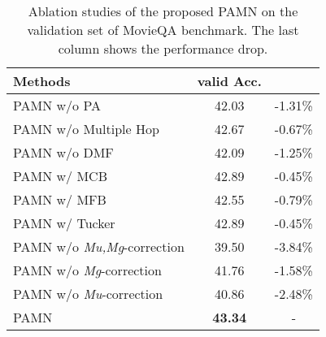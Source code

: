 \documentclass[10pt,twocolumn,letterpaper]{article}
\begin{document}
\begin{table}[t]
	\begin{center}
		\begin{tabular}{l||c|c}
			\hline 
			Methods                                   & valid Acc.     &   \\ \hline \hline
			PAMN w/o PA                               & 42.03          & -1.31\%   \\
			PAMN w/o Multiple Hop                     & 42.67          & -0.67\%   \\ \hline
			PAMN w/o DMF                              & 42.09          & -1.25\%   \\
			PAMN w/ MCB \cite{mcb}                    & 42.89          & -0.45\%   \\
			PAMN w/ MFB \cite{mfb}                    & 42.55          & -0.79\%   \\
			PAMN w/ Tucker \cite{mutan}               & 42.89          & -0.45\%   \\ \hline
			PAMN w/o \textit{Mu,Mg}-correction        & 39.50          & -3.84\%   \\
			PAMN w/o \textit{Mg}-correction           & 41.76          & -1.58\%   \\ 
			PAMN w/o \textit{Mu}-correction           & 40.86          & -2.48\%   \\ \hline
			PAMN                             & \textbf{43.34} & -         \\ \hline
		\end{tabular}
	\end{center}
	\caption{Ablation studies of the proposed PAMN on the validation set of MovieQA benchmark. The last column shows the performance drop.}
	\label{tab:abl}
\end{table}
\end{document}
